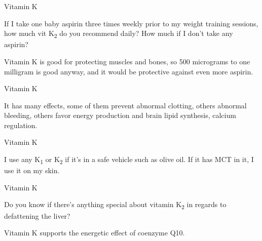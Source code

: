 \documentclass[11pt,oneside,openany,extrafontsizes]{memoir}
\begin{document}
\begin{qaexchange}{Vitamin K}

    \begin{question}
        If I take one baby aspirin three times weekly prior to my weight training sessions, how much vit K\textsubscript{2} do you recommend daily? How much if I don't take any aspirin?
    \end{question}

    \begin{answer}
        Vitamin K is good for protecting muscles and bones, so 500 micrograms to one milligram is good anyway, and it would be protective against even more aspirin.
    \end{answer}
\end{qaexchange}

\begin{standalonequote}{Vitamin K}

    \begin{answer}
       It has many effects, some of them prevent abnormal clotting, others abnormal bleeding, others favor energy production and brain lipid synthesis, calcium regulation. 
    \end{answer}
\end{standalonequote}

\begin{standalonequote}{Vitamin K}

    \begin{answer}
      I use any K\textsubscript{1} or K\textsubscript{2} if it's in a safe vehicle such as olive oil. If it has MCT in it, I use it on my skin.
    \end{answer}
\end{standalonequote}

\begin{qaexchange}{Vitamin K}

    \begin{question}
        Do you know if there's anything special about vitamin K\textsubscript{2} in regards to defattening the liver?
    \end{question}

    \begin{answer}
      Vitamin K supports the energetic effect of coenzyme Q10.
    \end{answer}
\end{qaexchange}
\end{document}
